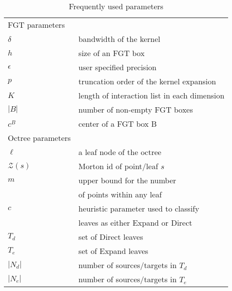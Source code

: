  
\begin{table}[ht!]
\small
\caption{\label{t:notation} Frequently used parameters}
\begin{tabular}{|ll|}
\hline 
FGT parameters &\\
$\delta$                    & bandwidth of the kernel\\
$h$                         & size of an FGT box \\
$\epsilon$                  & user specified precision\\
$p$                         & truncation order of the kernel expansion \\
$K$                         & length of interaction list in each dimension \\
$|B|$                       & number of non-empty FGT boxes \\
$c^B$                       & center of a FGT box B \\
\hline 
Octree parameters &\\
$\ell$                       & a leaf node of the octree \\
$\mathcal{Z}(s)$            & Morton id of point/leaf $s$ \\
$m$                         & upper bound for the number \\ 
                            & of points within any leaf \\
$c$                          & heuristic parameter used to classify \\
                            & leaves as either Expand or Direct \\
$T_d$                       & set of Direct leaves \\
$T_e$                       & set of Expand leaves \\ 
$|N_d|$                     & number of sources/targets in $T_d$ \\ 
$|N_e|$                     & number of sources/targets in $T_e$ \\ 
\hline
\end{tabular}
\end{table}

